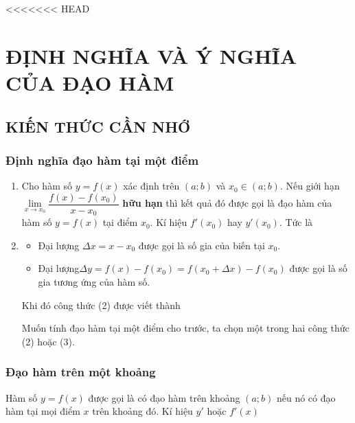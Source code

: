 <<<<<<< HEAD
\setcounter{section}{30}\setcounter{dang}{0}
\section{ĐỊNH NGHĨA VÀ Ý NGHĨA CỦA ĐẠO HÀM}
\subsection{KIẾN THỨC CẦN NHỚ}
\subsubsection{Định nghĩa đạo hàm tại một điểm}
\begin{enumerate}[\iconMT]
	\item {} Cho hàm số $y=f(x)$ xác định trên $(a;b)$ và $x_0 \in (a;b)$. Nếu giới hạn $\lim\limits_{x\to x_0}\dfrac{f(x)-f(x_0)}{x-x_0}$ \textbf{hữu hạn} thì kết quả đó được gọi là đạo hàm của hàm số $y=f(x)$ tại điểm $x_0$. Kí hiệu $f'(x_0)$ hay $y'(x_0)$. Tức là
	\item {}
	\begin{itemize}
		\item Đại lượng $\Delta x =x-x_0$ được gọi là số gia của biến tại $x_0$.
		\item Đại lượng$\Delta y =f(x)-f(x_0)=f(x_0+\Delta x)-f(x_0)$ được gọi là số gia tương ứng của hàm số.
	\end{itemize}
	Khi đó công thức (2) được viết thành 
	\begin{note}
		Muốn tính đạo hàm tại một điểm cho trước, ta chọn một trong hai công thức (2) hoặc (3).
	\end{note}
\end{enumerate}

\subsubsection{Đạo hàm trên một khoảng}
Hàm số $y=f(x)$ được gọi là có đạo hàm trên khoảng $(a;b)$ nếu nó có đạo hàm tại mọi điểm  $x$ trên khoảng đó. Kí hiệu $y'$ hoặc $f'(x)$

